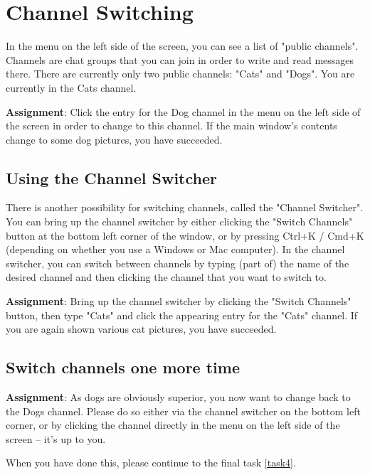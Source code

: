 \documentclass[paper=a4, fontsize=11pt]{scrartcl} %
\numberwithin{equation}{section} %
\numberwithin{figure}{section} %
\numberwithin{table}{section} %
\begin{document}

\section{Channel Switching}
\label{task2}

In the menu on the left side of the screen, you can see a list of "public channels".
Channels are chat groups that you can join in order to write and read messages there.
There are currently only two public channels: "Cats" and "Dogs".
You are currently in the Cats channel.

\textbf{Assignment}: Click the entry for the Dog channel in the menu on the left side of the screen in order to change to this channel.
If the main window's contents change to some dog pictures, you have succeeded.

\subsection{Using the Channel Switcher}

There is another possibility for switching channels, called the "Channel Switcher".
You can bring up the channel switcher by either clicking the "Switch Channels" button at the bottom left corner of the window, or by pressing Ctrl+K / Cmd+K (depending on whether you use a Windows or Mac computer).
In the channel switcher, you can switch between channels by typing (part of) the name of the desired channel and then clicking the channel that you want to switch to.

\textbf{Assignment}: Bring up the channel switcher by clicking the "Switch Channels" button, then type "Cats" and click the appearing entry for the "Cats" channel.
If you are again shown various cat pictures, you have succeeded.

\subsection{Switch channels one more time}

\textbf{Assignment}: As dogs are obviously superior, you now want to change back to the Dogs channel.
Please do so either via the channel switcher on the bottom left corner, or by clicking the channel directly in the menu on the left side of the screen -- it's up to you.

When you have done this, please continue to the final task \ref{task4}.

\end{document}
